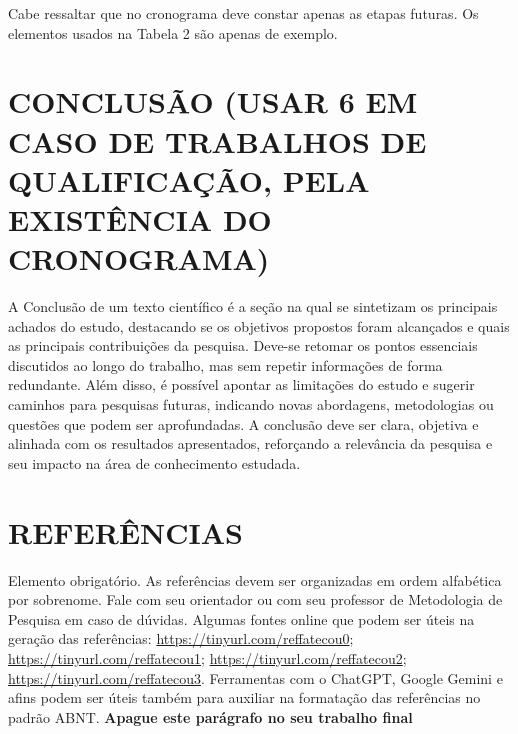 \documentclass[
	article,             %
	12pt,                %
	oneside,             %
	a4paper,             %
	english,             %
	brazil,              %
	sumario=tradicional
]{abntex2}
\begin{document}
Cabe ressaltar que no cronograma deve constar apenas as etapas futuras. Os elementos usados na Tabela 2 são apenas de exemplo.

% 


\section{\textbf{CONCLUSÃO (USAR 6 EM CASO DE TRABALHOS DE QUALIFICAÇÃO, PELA EXISTÊNCIA DO CRONOGRAMA)}}

A Conclusão de um texto científico é a seção na qual se sintetizam os principais achados do estudo, destacando se os objetivos propostos foram alcançados e quais as principais contribuições da pesquisa. Deve-se retomar os pontos essenciais discutidos ao longo do trabalho, mas sem repetir informações de forma redundante. Além disso, é possível apontar as limitações do estudo e sugerir caminhos para pesquisas futuras, indicando novas abordagens, metodologias ou questões que podem ser aprofundadas. A conclusão deve ser clara, objetiva e alinhada com os resultados apresentados, reforçando a relevância da pesquisa e seu impacto na área de conhecimento estudada.

\postextual

\section*{\textbf{REFERÊNCIAS}}

Elemento obrigatório. As referências devem ser organizadas em ordem alfabética por sobrenome. Fale com seu orientador ou com seu professor de Metodologia de Pesquisa em caso de dúvidas. Algumas fontes online que podem ser úteis na geração das referências: \url{https://tinyurl.com/reffatecou0};  \url{https://tinyurl.com/reffatecou1}; \url{https://tinyurl.com/reffatecou2}; \url{https://tinyurl.com/reffatecou3}. Ferramentas com o ChatGPT, Google Gemini e afins podem ser úteis também para auxiliar na formatação das referências no padrão ABNT. \textbf{Apague este parágrafo no seu trabalho final}
\end{document}

